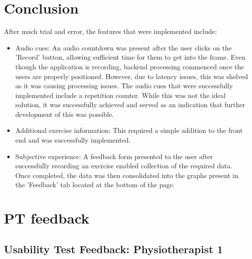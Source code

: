 \documentclass[12pt, titlepage]{article}
\begin{document}
\section{Conclusion}
After much trial and error, the features that were implemented include:
\begin{itemize}
    \item Audio cues: An audio countdown was present after the user clicks on the 'Record' button, allowing sufficient time for them 
    to get into the frame. Even though the application is recording, backend processing commenced once the users are
    properly positioned. However, due to latency issues, this was shelved as it was causing processing issues. The audio cues that were
    successfully implemented include a repetition counter. While this was not the ideal solution, it was successfully achieved and 
    served as an indication that further development of this was possible.
    \item Additional exercise information: This required a simple addition to the front end and was successfully implemented.
    \item Subjective experience: A feedback form presented to the user after successfully recording an exercise enabled collection of
    the required data. Once completed, the data was then consolidated into the graphs present in the 'Feedback' tab located at 
    the bottom of the page. 
\end{itemize}


\appendix
\section{PT feedback} \label{Appendix: PTfeed}
\subsection{Usability Test Feedback: Physiotherapist 1}
\end{document}
